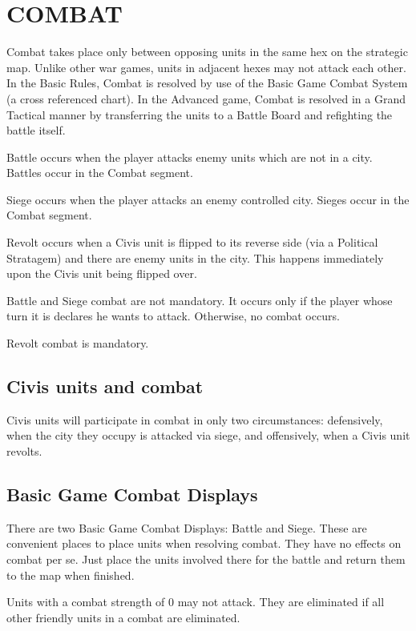 \section{COMBAT}

Combat takes place only between opposing units in the same hex on the strategic map. Unlike other war games, units in adjacent hexes may not attack each other. In the Basic Rules, Combat is resolved by use of the Basic Game Combat System (a cross referenced chart). In the Advanced game, Combat is resolved in a Grand Tactical manner by transferring the units to a Battle Board and refighting the battle itself.

Battle occurs when the player attacks enemy units which are not in a city. Battles occur in the Combat segment.

Siege occurs when the player attacks an enemy controlled city. Sieges occur in the Combat segment.

Revolt occurs when a Civis unit is flipped to its reverse side (via a Political Stratagem) and there are enemy units in the city. This happens immediately upon the Civis unit being flipped over.

Battle and Siege combat are not mandatory. It occurs only if the player whose turn it is declares he wants to attack. Otherwise, no combat occurs.

Revolt combat is mandatory.

\subsection{Civis units and combat}

Civis units will participate in combat in only two circumstances: defensively, when the city they occupy is attacked via siege, and offensively, when a Civis unit revolts.

\subsection{Basic Game Combat Displays}

There are two Basic Game Combat Displays: Battle and Siege. These are convenient places to place units when resolving combat. They have no effects on combat per se. Just place the units involved there for the battle and return them to the map when finished.

Units with a combat strength of 0 may not attack. They are eliminated if all other friendly units in a combat are eliminated.